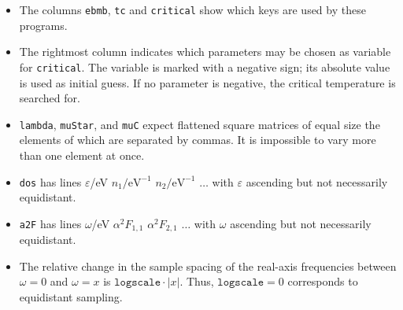 \documentclass[a4paper]{article}
\let\epsilon\varepsilon
\begin{document}
\begin{table}[b]
{         \begin{itemize}[itemsep=0pt]
            \item
               The columns \texttt{ebmb}, \texttt{tc} and \texttt{critical} show
               which keys are used by these programs.

            \item
               The rightmost column indicates which parameters may be chosen as
               variable for \texttt{critical}. The variable is marked with a
               negative sign; its absolute value is used as initial guess. If no
               parameter is negative, the critical temperature is searched for.

            \item
               \texttt{lambda}, \texttt{muStar}, and \texttt{muC} expect
               flattened square matrices of equal size the elements of which
               are separated by commas. It is impossible to vary more than one
               element at once.

            \item
               \texttt{dos} has lines $\epsilon$/eV $n_1 / \mathrm{eV}^{-1}$
               $n_2 / \mathrm{eV}^{-1}$ $\dots$ with $\epsilon$ ascending but
               not necessarily equidistant.

            \item
               \texttt{a2F} has lines $\omega$/eV $\alpha^2 F_{1, 1}$ $\alpha^2
               F_{2, 1}$ $\dots$ with $\omega$ ascending but not necessarily
               equidistant.

            \item
               The relative change in the sample spacing of the real-axis
               frequencies between $\omega = 0$ and $\omega = x$ is
               $\texttt{logscale} \cdot |x|$. Thus, $\texttt{logscale} = 0$
               corresponds to equidistant sampling.
         \end{itemize}
         }
      \label{parameters}
   \end{table}
\end{document}
